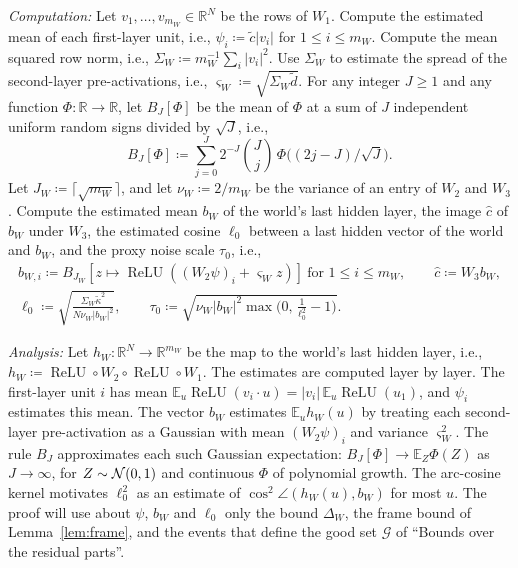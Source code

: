 \documentclass[10pt]{article}
\newcommand{\RR}{\mathbb{R}}
\newcommand{\Gg}{\mathcal{G}}\newcommand{\Hh}{\mathcal{H}}
\newcommand{\EE}{\mathbb{E}}
\newcommand{\relu}{\operatorname{ReLU}}
\newcommand{\chat}{\hat c}
\begin{document}
\begin{enumerate}[leftmargin=*,itemsep=8pt,topsep=10pt plus 2pt]
  \emph{Computation:} Let $v_1,\dots,v_{m_W}\in\RR^N$ be the rows of $W_1$.
  Compute the estimated mean of each first-layer unit, i.e.,
  $\psi_i\coloneqq \tilde c|v_i|$ for $1\le i\le m_W$. Compute the mean
  squared row norm, i.e., $\Sigma_W\coloneqq m_W^{-1}\sum_i|v_i|^2$. Use $\Sigma_W$ to
  estimate the spread of the second-layer pre-activations, i.e.,
  $\varsigma_W\coloneqq \sqrt{\Sigma_W\tilde d}$. For any integer $J\ge1$ and
  any function $\Phi:\RR\to\RR$, let $B_J[\Phi]$ be the mean of $\Phi$ at a
  sum of $J$ independent uniform random signs divided by $\sqrt J$, i.e.,
  \[B_J[\Phi]\coloneqq \sum_{j=0}^J2^{-J}\binom Jj\,\Phi\bigl((2j-J)/\sqrt J\bigr).\]
  Let $J_W\coloneqq \lceil\sqrt{m_W}\rceil$, and let $\nu_W\coloneqq 2/m_W$ be
  the variance of an entry of $W_2$ and $W_3$. Compute the estimated mean
  $b_W$ of the world's last hidden layer, the image $\chat$ of $b_W$ under $W_3$, the estimated
  cosine $\ell_0$ between a last hidden vector of the world and $b_W$, and
  the proxy noise scale $\tau_0$, i.e.,
  \begin{gather*}
  b_{W,i}\coloneqq B_{J_W}[z\mapsto\relu((W_2\psi)_i+\varsigma_Wz)]\ \text{for }1\le i\le m_W,\qquad
  \chat\coloneqq W_3b_W,\\
  \ell_0\coloneqq \sqrt{\frac{\Sigma_W\tilde\kappa^2}{N\nu_W|b_W|^2}},\qquad
  \tau_0\coloneqq \sqrt{\nu_W|b_W|^2\max\bigl(0,\,\tfrac1{\ell_0^2}-1\bigr)}.
  \end{gather*}

  \emph{Analysis:} Let $h_W:\RR^N\to\RR^{m_W}$ be the map to the world's
  last hidden layer, i.e., $h_W\coloneqq \relu\circ W_2\circ\relu\circ W_1$.
  The estimates are computed layer by layer. The first-layer unit $i$ has mean
  $\EE_u\relu(v_i\cdot u)=|v_i|\,\EE_u\relu(u_1)$, and $\psi_i$ estimates this mean.
  The vector $b_W$ estimates $\EE_uh_W(u)$ by treating each second-layer
  pre-activation as a Gaussian with mean $(W_2\psi)_i$ and variance
  $\varsigma_W^2$. The rule $B_J$ approximates each such Gaussian expectation:
  $B_J[\Phi]\to\EE_Z\Phi(Z)$ as $J\to\infty$, for $Z\sim\mathcal{N}(0,1)$ and
  continuous $\Phi$ of polynomial growth. The arc-cosine kernel motivates
  $\ell_0^2$ as an estimate of $\cos^2\angle(h_W(u),b_W)$ for most $u$. The
  proof will use about $\psi$, $b_W$ and $\ell_0$ only the
  bound $\Delta_W$, the frame bound of Lemma~\ref{lem:frame}, and the events
  that define the good set $\Gg$ of ``Bounds over the residual parts''.


\end{enumerate}
\end{document}
